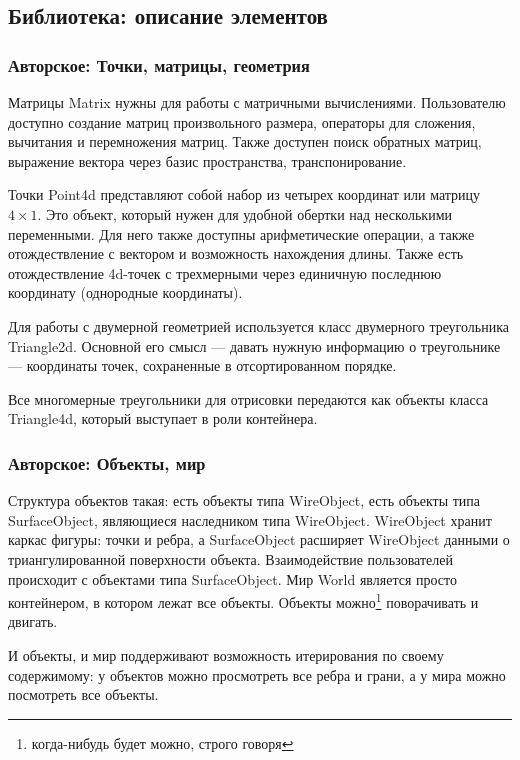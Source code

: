 \documentclass{article}
\begin{document}
\subsection{Библиотека: описание элементов}

\subsubsection{Авторское: Точки, матрицы, геометрия}

Матрицы Matrix нужны для работы с матричными вычислениями. Пользователю доступно создание матриц произвольного размера, операторы для сложения, вычитания и перемножения матриц. Также доступен поиск обратных матриц, выражение вектора через базис пространства, транспонирование.

Точки Point4d представляют собой набор из четырех координат или матрицу $4 \times 1$. Это объект, который нужен для удобной обертки над несколькими переменными. Для него также доступны арифметические операции, а также отождествление с вектором и возможность нахождения длины. Также есть отождествление 4d-точек с трехмерными через единичную последнюю координату (однородные координаты).

Для работы с двумерной геометрией используется класс двумерного треугольника Triangle2d. Основной его смысл — давать нужную информацию о треугольнике — координаты точек, сохраненные в отсортированном порядке.

Все многомерные треугольники для отрисовки передаются как объекты класса Triangle4d, который выступает в роли контейнера.

\subsubsection{Авторское: Объекты, мир}

Структура объектов такая: есть объекты типа WireObject, есть объекты типа SurfaceObject, являющиеся наследником типа WireObject. WireObject хранит каркас фигуры: точки и ребра, а SurfaceObject расширяет WireObject данными о триангулированной поверхности объекта. Взаимодействие пользователей происходит с объектами типа SurfaceObject. Мир World является просто контейнером, в котором лежат все объекты. Объекты можно\footnote{ когда-нибудь будет можно, строго говоря} поворачивать и двигать.

И объекты, и мир поддерживают возможность итерирования по своему содержимому: у объектов можно просмотреть все ребра и грани, а у мира можно посмотреть все объекты.
\end{document}
